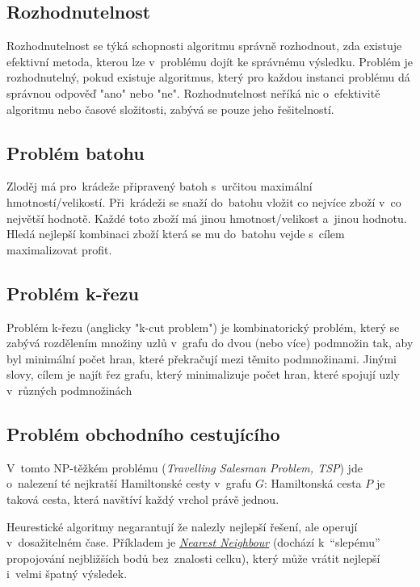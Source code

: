 \subsection{Rozhodnutelnost}

Rozhodnutelnost se týká schopnosti algoritmu správně rozhodnout, zda existuje efektivní metoda, kterou lze v~problému dojít ke správnému výsledku. Problém je rozhodnutelný, pokud existuje algoritmus, který pro každou instanci problému dá správnou odpověď "ano" nebo "ne". Rozhodnutelnost neříká nic o~efektivitě algoritmu nebo časové složitosti, zabývá se pouze jeho řešitelností.

\subsection{Problém batohu}

Zloděj má pro~krádeže připravený batoh s~určitou maximální hmotností/velikostí.
Při~krádeži se snaží do~batohu vložit co nejvíce zboží v~co největší hodnotě.
Každé toto zboží má jinou hmotnost/velikost a~jinou hodnotu.
Hledá nejlepší kombinaci zboží která se mu do~batohu vejde s~cílem maximalizovat profit.

\subsection{Problém k-řezu}

Problém k-řezu (anglicky "k-cut problem") je kombinatorický problém, který se zabývá rozdělením množiny uzlů v~grafu do dvou (nebo více) podmnožin tak, aby byl minimální počet hran, které překračují mezi těmito podmnožinami. Jinými slovy, cílem je najít řez grafu, který minimalizuje počet hran, které spojují uzly v~různých podmnožinách

\subsection{Problém obchodního cestujícího}

V~tomto NP-těžkém problému (\emph{Travelling Salesman Problem, TSP}) jde o~nalezení té nejkratší Hamiltonské cesty v~grafu $G$:
Hamiltonská cesta $P$ je taková cesta, která navštíví každý vrchol právě jednou.

Heurestické algoritmy negarantují že nalezly nejlepší řešení, ale operují v~dosažitelném čase.
Příkladem je \href{https://en.wikipedia.org/wiki/Nearest_neighbour_algorithm}{\emph{Nearest Neighbour}} (dochází k~\enquote{slepému} propojování nejbližších bodů bez~znalosti celku), který může vrátit nejlepší i~velmi špatný výsledek.

